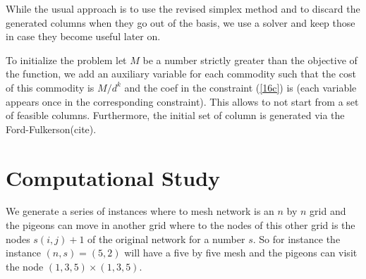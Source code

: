 \documentclass{article}
\begin{document}
	While the usual approach is to use the revised simplex method and to discard the generated columns when they go out of the basis, we use a solver and keep those in case they become useful later on. 
	
	To initialize the problem let $M$ be a number strictly greater than the objective of the function, we add an auxiliary variable for each commodity such that the cost of this commodity is $M/d^k$ and the coef in the constraint (\ref{16c}) is (each variable appears once in the corresponding constraint). This allows to not start from a set of feasible columns. Furthermore, the initial set of column is generated via the Ford-Fulkerson(cite). 
	
	\section{Computational Study}
	
	We generate a series of instances where to mesh network is an $n$ by $n$ grid and the pigeons can move in another grid where to the nodes of this other grid is the nodes $s(i, j) + 1$ of the original network for a number $s$. So for instance the instance $(n, s)=(5, 2)$ will have a five by five mesh and the pigeons can visit the node $(1, 3, 5) \times (1, 3, 5)$. 
	
	
\printbibliography
\end{document}
